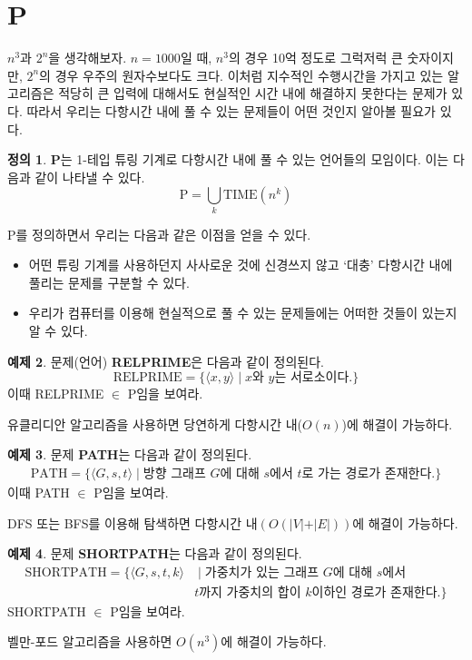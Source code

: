 \documentclass[b5paper, 10pt]{book}
\theoremstyle{definition}
\newtheorem{defn}{정의}[chapter]
\newtheorem{ex}[defn]{예제}
\newenvironment{pf*}{\pushQED{\qed}\pf}{\popQED\endpf}
\begin{document}
\section{P}
$n^3$과 $2^n$을 생각해보자. $n=1000$일 때, $n^3$의 경우 10억 정도로 그럭저럭 큰
숫자이지만, $2^n$의 경우 우주의 원자수보다도 크다. 이처럼 지수적인 수행시간을 가지고
있는 알고리즘은 적당히 큰 입력에 대해서도 현실적인 시간 내에 해결하지 못한다는 문제가 있다.
따라서 우리는 다항시간 내에 풀 수 있는 문제들이 어떤 것인지 알아볼 필요가 있다.
\begin{defn}
    \textbf{P}는 1-테입 튜링 기계로 다항시간 내에 풀 수 있는 언어들의 모임이다. 이는 다음과
    같이 나타낼 수 있다.
    $$\text{P} = \bigcup_k \text{TIME}(n^k)$$ 
\end{defn} 
P를 정의하면서 우리는 다음과 같은 이점을 얻을 수 있다.
\begin{itemize}
    \item 어떤 튜링 기계를 사용하던지 사사로운 것에 신경쓰지 않고 
    `대충' 다항시간 내에 풀리는 문제를 구분할 수 있다.
    \item 우리가 컴퓨터를 이용해 현실적으로 풀 수 있는 문제들에는 어떠한 것들이 있는지 알 수 있다. 
\end{itemize}
\begin{ex}
    문제(언어) \textbf{RELPRIME}은 다음과 같이 정의된다. 
    $$\text{RELPRIME} = \{\langle x,y \rangle  \;\vert\; x\text{와 } y\text{는 서로소이다.}\}$$
    이때 RELPRIME $\in $ P임을 보여라.  
\end{ex}
\begin{pf*}
    유클리디안 알고리즘을 사용하면 당연하게 다항시간 내($O(n)$)에 해결이 가능하다. 
\end{pf*}
\begin{ex}
    문제 \textbf{PATH}는 다음과 같이 정의된다.
    \begin{align*}
        \text{PATH}= \{\langle G, s, t \rangle \;\vert\; \text{방향 그래프 } G\text{에 대해 }s
    \text{에서 }t\text{로 가는 경로가 존재한다.}\}
    \end{align*}
    이때 PATH $\in $ P임을 보여라.
\end{ex}
\begin{pf*}
    DFS 또는 BFS를 이용해 탐색하면 다항시간 내$(O(\vert V \vert + 
    \vert E \vert))$에 해결이 가능하다. 
\end{pf*}
\begin{ex}
    문제 \textbf{SHORTPATH}는 다음과 같이 정의된다.
    \begin{align*}
        \text{SHORTPATH} = \{ \langle G,s, t, k \rangle & \;\vert\; \text{가중치가 있는 그래프 }
          G \text{에 대해 } s \text{에서 } \\ 
        & t \text{까지 가중치의 합이 } k \text{이하인 경로가 존재한다.} \}
    \end{align*}
    SHORTPATH $\in $ P임을 보여라.
\end{ex}
\begin{pf*}
    벨만-포드 알고리즘을 사용하면 $O(n^3)$에 해결이 가능하다.
\end{pf*}
\end{document}
